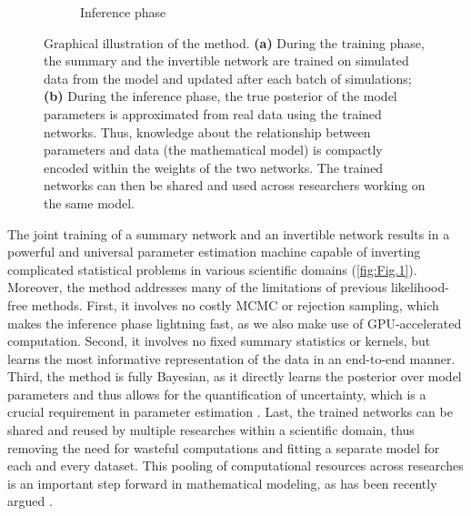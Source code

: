 \documentclass[9pt,twoside,lineno]{pnas-new}
\begin{document}
\begin{figure}
\begin{subfigure}[b]{1.0\textwidth}
    \caption{Inference phase}
    \label{fig:Fig.1b}
  \end{subfigure}
      \caption{Graphical illustration of the method. \textbf{(a)} During the training phase, the summary and the invertible network are trained on simulated data from the model and updated after each batch of simulations; \textbf{(b)} During the inference phase, the true posterior of the model parameters is approximated from real data using the trained networks. Thus, knowledge about the relationship between parameters and data (the mathematical model) is compactly encoded within the weights of the two networks. The trained networks can then be shared and used across researchers working on the same model.} \label{fig:Fig.1}
\end{figure}
The joint training of a summary network and an invertible network results in a powerful and universal parameter estimation machine capable of inverting complicated statistical problems in various scientific domains (\autoref{fig:Fig.1}). Moreover, the method addresses many of the limitations of previous likelihood-free methods. First, it involves no costly MCMC or rejection sampling, which makes the inference phase lightning fast, as we also make use of GPU-accelerated computation. Second, it involves no fixed summary statistics or kernels, but learns the most informative representation of the data in an end-to-end manner. Third, the method is fully Bayesian, as it directly learns the posterior over model parameters and thus allows for the quantification of uncertainty, which is a crucial requirement in parameter estimation \cite{kendall2017uncertainties, gelman2013bayesian}. Last, the trained networks can be shared and reused by multiple researches within a scientific domain, thus removing the need for wasteful computations and fitting a separate model for each and every dataset. This pooling of computational resources across researches is an important step forward in mathematical modeling, as has been recently argued \cite{mestdagh2018prepaid}.
\end{document}
